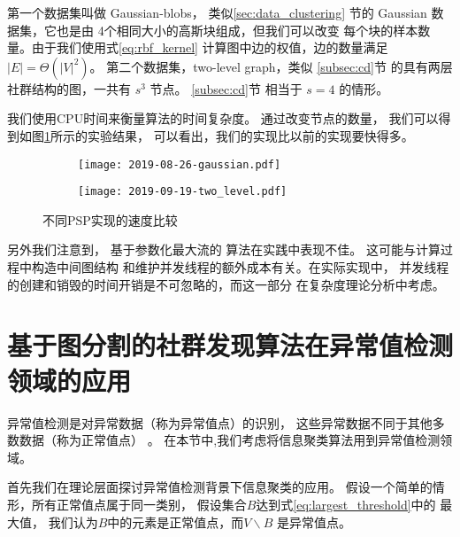 第一个数据集叫做 Gaussian-blobs，
类似\ref{sec:data_clustering}
节的 Gaussian 数据集，它也是由
4个相同大小的高斯块组成，但我们可以改变
每个块的样本数量。由于我们使用式\ref{eq:rbf_kernel}
计算图中边的权值，边的数量满足 $|E|=\Theta(|V|^2)$。
第二个数据集，two-level graph，类似 \ref{subsec:cd}节
的具有两层社群结构的图，一共有 $s^3$ 节点。
\ref{subsec:cd}节 相当于 $s=4$ 的情形。

我们使用CPU时间来衡量算法的时间复杂度。
通过改变节点的数量，
我们可以得到如图\ref{fig:esc}所示的实验结果，
可以看出，我们的实现比以前的实现要快得多。
\begin{figure}
	\centering
	\begin{subfigure}{0.45\textwidth}
		\texttt{[image: 2019-08-26-gaussian.pdf]}
	\end{subfigure}
	\begin{subfigure}{0.45\textwidth}
		\texttt{[image: 2019-09-19-two\_level.pdf]}
	\end{subfigure}
	\caption{
  不同PSP实现的速度比较}\label{fig:esc}
\end{figure}

另外我们注意到，
基于参数化最大流的
算法\citep{kolmogorov}在实践中表现不佳。
这可能与计算过程中构造中间图结构
和维护并发线程的额外成本有关。在实际实现中，
并发线程的创建和销毁的时间开销是不可忽略的，而这一部分
在复杂度理论分析中考虑。

\section{基于图分割的社群发现算法在异常值检测领域的应用}
异常值检测是对异常数据（称为异常值点）的识别，
这些异常数据不同于其他多数数据（称为正常值点）
\citep{grubbs1969procedures}。
在本节中,我们考虑将信息聚类算法用到异常值检测领域。

首先我们在理论层面探讨异常值检测背景下信息聚类的应用。
假设一个简单的情形，所有正常值点属于同一类别，
假设集合$B$达到式\eqref{eq:largest_threshold}中的
最大值，
我们认为$B$中的元素是正常值点，而$V\backslash B$ 是异常值点。

